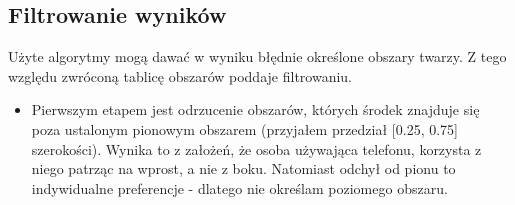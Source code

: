 \documentclass[10pt, a4paper]{article}
\begin{document}
\subsection{Filtrowanie wyników}
Użyte algorytmy mogą dawać w wyniku błędnie określone obszary twarzy. Z tego względu zwróconą tablicę obszarów poddaje filtrowaniu.
\begin{itemize}
    \item Pierwszym etapem jest odrzucenie obszarów, których środek znajduje się poza ustalonym pionowym obszarem (przyjałem przedział [0.25, 0.75] szerokości). Wynika to z założeń, że osoba używająca telefonu, korzysta z niego patrząc na wprost, a nie z boku. Natomiast odchył od pionu to indywidualne preferencje - dlatego nie określam poziomego obszaru.

    \begin{figure}[H]
        \begin{center}

\end{center}
\end{figure}
\end{itemize}
\end{document}

